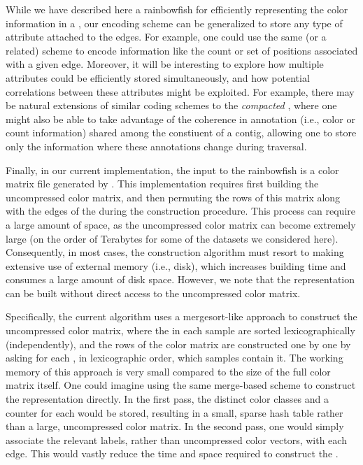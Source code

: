 While we have described here a rainbowfish for efficiently representing the color
information in a \cdbg, our encoding scheme can be generalized to store any type
of attribute attached to the edges. For example, one could use the same (or a
related) scheme to encode information like the \kmer count or set of positions
associated with a given edge. Moreover, it will be interesting to explore how
multiple attributes could be efficiently stored simultaneously, and how
potential correlations between these attributes might be exploited. For example,
there may be natural extensions of similar coding schemes to the
\emph{compacted} \dbg, where one might also be able to take advantage of the
coherence in annotation (i.e., color or count information) shared among the
constiuent \kmers of a contig, allowing one to store only the information where
these annotations change during traversal.

Finally, in our current implementation, the input to the rainbowfish is a color
matrix file generated by \vari. This implementation requires first building the
uncompressed color matrix, and then permuting the rows of this matrix along with
the edges of the \dbg during the \boss construction procedure. 
%
%
%
This process can require a large amount of space, as the uncompressed color
matrix can become extremely large (on the order of Terabytes for some of the
datasets we considered here). Consequently, in most cases, the construction
algorithm must resort to making extensive use of external memory (i.e., disk),
which increases building time and consumes a large amount of disk space.
However, we note that the \rainbowfish representation can be built without direct
access to the uncompressed color matrix.

Specifically, the current \vari algorithm uses a mergesort-like approach to
construct the uncompressed color matrix, where the \kmers in each sample are
sorted lexicographically (independently), and the rows of the color matrix are
constructed one by one by asking for each \kmer, in lexicographic order, which
samples contain it. The working memory of this approach is very small compared
to the size of the full color matrix itself. One could imagine using the same
merge-based scheme to construct the \rainbowfish representation directly. In the
first pass, the distinct color classes and a counter for each would be stored,
resulting in a small, sparse hash table rather than a large, uncompressed color
matrix. In the second pass, one would simply associate the relevant
labels, rather than uncompressed color vectors, with each edge. This would
vastly reduce the time and space required to construct the \cdbg.

